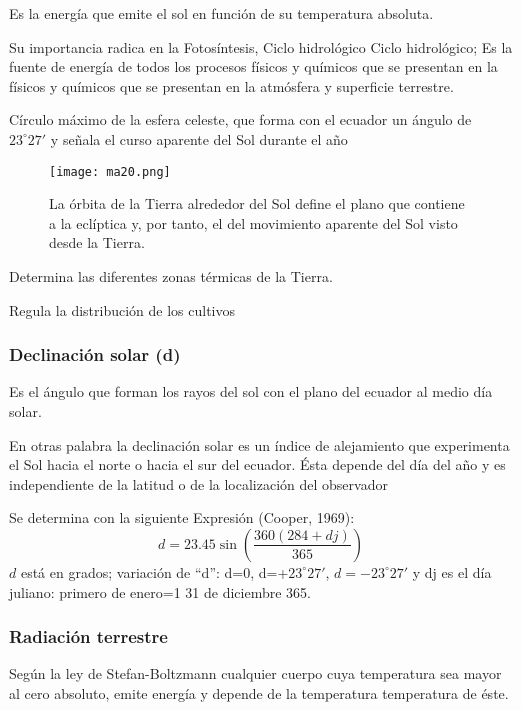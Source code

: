 \begin{definition}
Es la energía que emite el sol en función de su temperatura absoluta.
\end{definition}
Su importancia radica en la  Fotosíntesis, Ciclo hidrológico Ciclo hidrológico; Es la fuente de energía de todos los procesos físicos y químicos que se presentan en la físicos y químicos que se presentan en la atmósfera y superficie terrestre.
\begin{definition}[La eclíptica]
    Círculo máximo de la esfera celeste, que forma con el ecuador un ángulo de $23^{\circ} 27'$ y señala el curso aparente del Sol durante el año
\end{definition}
\begin{figure}[h!]
\centering
  \texttt{[image: ma20.png]}
  \caption{La órbita de la Tierra alrededor del Sol define el plano que contiene a la eclíptica y, por tanto, el del movimiento aparente del Sol visto desde la Tierra.}
  \label{ma20}
\end{figure}
Determina las diferentes zonas térmicas de la
Tierra.

Regula la distribución de los cultivos

\subsubsection{Declinación solar (d)}
Es el ángulo que forman los rayos del sol con el plano del ecuador al medio día solar.

En otras palabra la declinación solar es un índice de alejamiento que
experimenta el Sol hacia el norte o hacia el sur
del ecuador. Ésta depende del día del año y es independiente de la latitud o de la localización del observador

Se determina con la siguiente Expresión (Cooper, 1969):
\begin{equation}
    d = 23.45 \sin{\left(\frac{360(284 +dj)}{365}\right)} 
\end{equation}
$d$ está en grados; variación de ``d'': d=0, d=+$23^{\circ} 27'$, $d=-23^{\circ} 27'$ y dj es el día juliano: primero de enero=1 31 de diciembre 365.

\subsubsection{Radiación terrestre}
Según la ley de Stefan-Boltzmann cualquier cuerpo cuya temperatura sea mayor al cero absoluto, emite energía y depende de la temperatura temperatura de éste.

